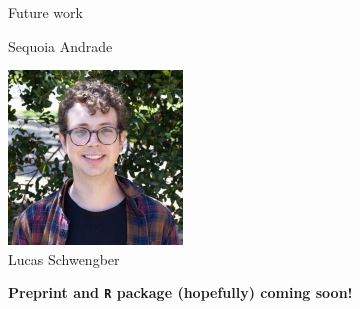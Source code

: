 \begin{frame}{Future work}
{\begin{minipage}[t]{0.24\textwidth}
    Sequoia Andrade
\end{minipage}
\begin{minipage}[t]{0.24\textwidth}
    \centering
\includegraphics[height=0.9\textwidth]{static_figures/lucas.jpg}\\
Lucas Schwengber
\end{minipage}

}

\hrulefill

\textbf{Preprint and \texttt{R} package (hopefully) coming soon!}


\end{frame}



